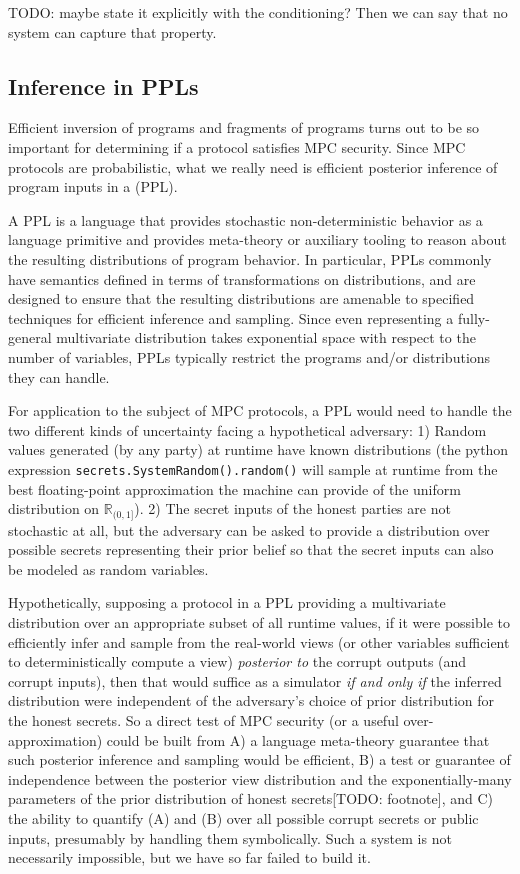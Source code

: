 \documentclass[conference]{IEEEtran}
\begin{document}
TODO: maybe state it explicitly with the conditioning? Then we can say that no system can capture that property.

\subsection{Inference in PPLs}

Efficient inversion of programs and fragments of programs turns out to be so important for determining if a protocol satisfies MPC security.
Since MPC protocols are probabilistic, what we really need is efficient posterior inference of program inputs in a
 (PPL).

A PPL is a language that provides stochastic non-deterministic behavior as a language primitive
and provides meta-theory or auxiliary tooling to reason about the resulting distributions of program behavior.
In particular, PPLs commonly have semantics defined in terms of transformations on distributions,
and are designed to ensure that the resulting distributions are amenable to specified techniques for efficient
inference and sampling. Since even representing a fully-general multivariate distribution takes exponential space with respect to the number of variables,
PPLs typically restrict the programs and/or distributions they can handle.

For application to the subject of MPC protocols, a PPL would need to handle the two different kinds of uncertainty facing a hypothetical adversary:
1) Random values generated (by any party) at runtime have known distributions
(\eg the python expression \texttt{secrets.SystemRandom().random()}
will sample at runtime from the best floating-point approximation the machine can provide
of the uniform distribution on $\mathbb{R}_{(0,1]}$).
2) The secret inputs of the honest parties are not stochastic at all, but the adversary can be asked to provide a distribution over
possible secrets representing their prior belief so that the secret inputs can also be modeled as random variables.

Hypothetically, supposing a protocol in a PPL providing a multivariate distribution over an appropriate subset of all runtime values,
if it were possible to efficiently infer and sample from the real-world views
(or other variables sufficient to deterministically compute a view)
\textit{posterior to} the corrupt outputs (and corrupt inputs),
then that would suffice as a simulator
\textit{if and only if} the inferred distribution were independent of the adversary's choice of prior distribution for the honest secrets.
So a direct test of MPC security (or a useful over-approximation) could be built from
A) a language meta-theory guarantee that such posterior inference and sampling would be efficient,
B) a test or guarantee of independence between the posterior view distribution and the exponentially-many parameters
of the prior distribution of honest secrets[TODO: footnote], and
C) the ability to quantify (A) and (B) over all possible corrupt secrets or public inputs, presumably by handling them symbolically.
Such a system is not necessarily impossible, but we have so far failed to build it.
\end{document}
